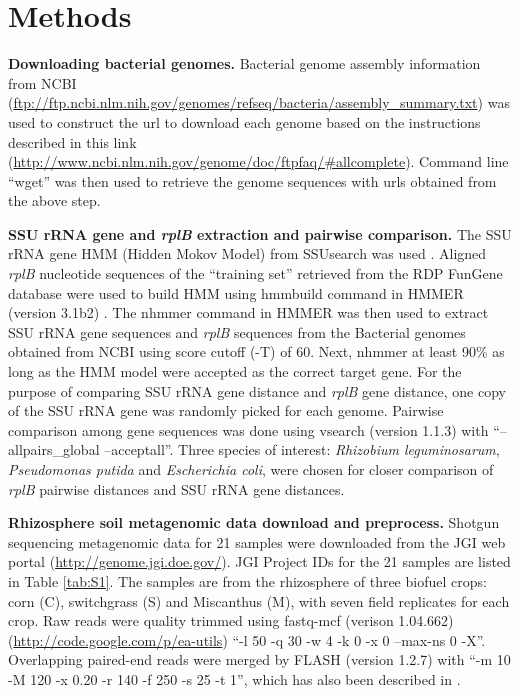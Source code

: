 \documentclass[]{msu-thesis}
\begin{document}
\section{Methods}

\textbf{Downloading bacterial genomes. }
Bacterial genome assembly information from NCBI (\url{ftp://ftp.ncbi.nlm.nih.gov/genomes/refseq/bacteria/assembly_summary.txt}) was used to construct the url to download each genome based on the instructions described in this link (\url{http://www.ncbi.nlm.nih.gov/genome/doc/ftpfaq/#allcomplete}). Command line ``wget'' was then used to retrieve the genome sequences with urls obtained from the above step. 

\textbf{SSU rRNA gene and \textit{rplB} extraction and pairwise comparison. }
The SSU rRNA gene HMM (Hidden Mokov Model) from SSUsearch was used \cite{guo_microbial_2015}. Aligned \textit{rplB} nucleotide sequences of the ``training set'' retrieved from the RDP FunGene database were used to build HMM using hmmbuild command in HMMER (version 3.1b2) \cite{eddy_new_2009,fish_fungene:_2013}. The nhmmer command in HMMER was then used to extract SSU rRNA gene sequences and \textit{rplB} sequences from the Bacterial genomes obtained from NCBI using score cutoff (-T) of 60. Next, nhmmer at least 90\% as long as the HMM model were accepted as the correct target gene. For the purpose of comparing SSU rRNA gene distance and \textit{rplB} gene distance, one copy of the SSU rRNA gene was randomly picked for each genome. Pairwise comparison among gene sequences was done using vsearch (version 1.1.3) \cite{rognes_vsearch:_2016} with ``--allpairs\_global --acceptall''. Three species of interest: \textit{Rhizobium leguminosarum}, \textit{Pseudomonas putida} and \textit{Escherichia coli}, were chosen for closer comparison of \textit{rplB} pairwise distances and SSU rRNA gene distances.


\textbf{Rhizosphere soil metagenomic data download and preprocess. }
Shotgun sequencing metagenomic data for 21 samples were downloaded from the JGI web portal (\url{http://genome.jgi.doe.gov/}). JGI Project IDs for the 21 samples are listed in Table \ref{tab:S1}. The samples are from the rhizosphere of three biofuel crops: corn (C), switchgrass (S) and Miscanthus (M), with seven field replicates for each crop. Raw reads were quality trimmed using fastq-mcf (verison 1.04.662) (\url{http://code.google.com/p/ea-utils}) ``-l 50 -q 30 -w 4 -k 0 -x 0 --max-ns 0 -X''. Overlapping paired-end reads were merged by FLASH (version 1.2.7) \cite{magoc_flash:_2011} with ``-m 10 -M 120 -x 0.20 -r 140 -f 250 -s 25 -t 1'', which has also been described in \cite{guo_microbial_2015}. 
\end{document}
